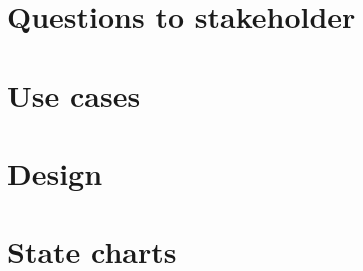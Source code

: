 \documentclass[a4paper,11pt]{article}
\begin{document}
	
	
	\tableofcontents
	\newpage
	
	\section{Questions to stakeholder}
	
	\newpage
	
	\section{Use cases}
	
	\newpage

	\section{Design}
	
	\newpage

	\section{State charts}
	
	\newpage
\end{document}

